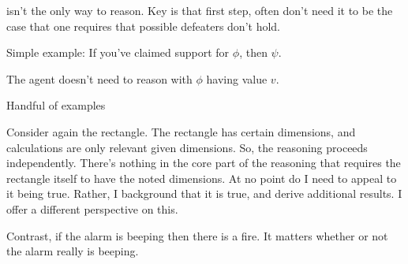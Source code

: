 

\begin{note}
  \RBV{} isn't the only way to reason.
  Key is that first step, often don't need it to be the case that one requires that possible defeaters don't hold.

  Simple example:
  If you've claimed support for \(\phi\), then \(\psi\).

  The agent doesn't need to reason with \(\phi\) having value \(v\).

  Handful of examples
\end{note}

\begin{note}
  Consider again the rectangle.
  The rectangle has certain dimensions, and calculations are only relevant given dimensions.
  So, the reasoning proceeds independently.
  There's nothing in the core part of the reasoning that requires the rectangle itself to have the noted dimensions.
  At no point do I need to appeal to it being true.
  Rather, I background that it is true, and derive additional results.
  {
    \color{red}
    I offer a different perspective on this.
  }

  Contrast, if the alarm is beeping then there is a fire.
  It matters whether or not the alarm really is beeping.

\end{note}

